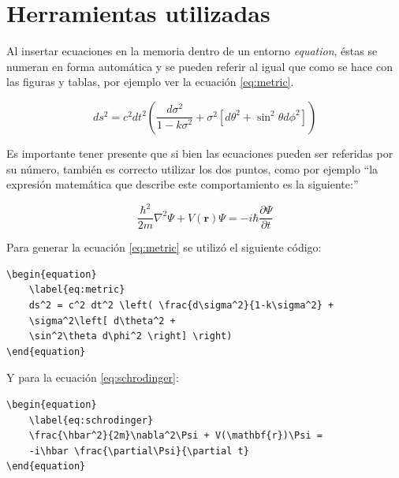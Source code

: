 \section{Herramientas utilizadas}
\label{sec:Ecuaciones}

Al insertar ecuaciones en la memoria dentro de un entorno \textit{equation}, éstas se numeran en forma automática  y se pueden referir al igual que como se hace con las figuras y tablas, por ejemplo ver la ecuación \ref{eq:metric}.

\begin{equation}
	\label{eq:metric}
	ds^2 = c^2 dt^2 \left( \frac{d\sigma^2}{1-k\sigma^2} + \sigma^2\left[ d\theta^2 + \sin^2\theta d\phi^2 \right] \right)
\end{equation}
                                                        
Es importante tener presente que si bien las ecuaciones pueden ser referidas por su número, también es correcto utilizar los dos puntos, como por ejemplo ``la expresión matemática que describe este comportamiento es la siguiente:''

\begin{equation}
	\label{eq:schrodinger}
	\frac{\hbar^2}{2m}\nabla^2\Psi + V(\mathbf{r})\Psi = -i\hbar \frac{\partial\Psi}{\partial t}
\end{equation}

Para generar la ecuación \ref{eq:metric} se utilizó el siguiente código:

\begin{verbatim}
\begin{equation}
	\label{eq:metric}
	ds^2 = c^2 dt^2 \left( \frac{d\sigma^2}{1-k\sigma^2} + 
	\sigma^2\left[ d\theta^2 + 
	\sin^2\theta d\phi^2 \right] \right)
\end{equation}
\end{verbatim}

Y para la ecuación \ref{eq:schrodinger}:

\begin{verbatim}
\begin{equation}
	\label{eq:schrodinger}
	\frac{\hbar^2}{2m}\nabla^2\Psi + V(\mathbf{r})\Psi = 
	-i\hbar \frac{\partial\Psi}{\partial t}
\end{equation}

\end{verbatim}